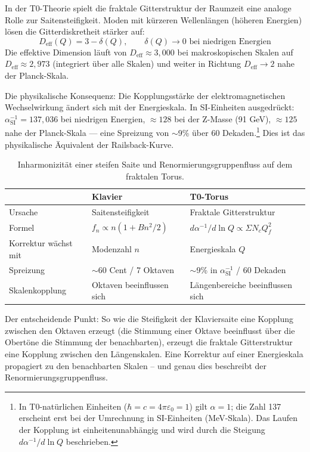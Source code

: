In der T0-Theorie spielt die fraktale Gitterstruktur der Raumzeit eine analoge Rolle zur Saitensteifigkeit. Moden mit kürzeren Wellenlängen (höheren Energien) lösen die Gitterdiskretheit stärker auf:
\begin{equation}
	D_\text{eff}(Q) = 3 - \delta(Q), \qquad \delta(Q) \to 0 \text{ bei niedrigen Energien}
\end{equation}
Die effektive Dimension läuft von $D_\text{eff} \approx 3{,}000$ bei makroskopischen Skalen auf $D_\text{eff} \approx 2{,}973$ (integriert über alle Skalen) und weiter in Richtung $D_\text{eff} \to 2$ nahe der Planck-Skala.

Die physikalische Konsequenz: Die Kopplungsstärke der elektromagnetischen Wechselwirkung ändert sich mit der Energieskala. In SI-Einheiten ausgedrückt: $\alpha_\text{SI}^{-1} = 137{,}036$ bei niedrigen Energien, $\approx 128$ bei der Z-Masse (91 GeV), $\approx 125$ nahe der Planck-Skala --- eine Spreizung von $\sim$9\% über 60 Dekaden.\footnote{In T0-natürlichen Einheiten ($\hbar = c = 4\pi\varepsilon_0 = 1$) gilt $\alpha = 1$; die Zahl 137 erscheint erst bei der Umrechnung in SI-Einheiten (MeV-Skala). Das Laufen der Kopplung ist einheitenunabhängig und wird durch die Steigung $d\alpha^{-1}/d\ln Q$ beschrieben.} Dies ist das physikalische Äquivalent der Railsback-Kurve.

\begin{table}[h]
\centering
\begin{tabular}{lll}
	\toprule
	& Klavier & T0-Torus\\
	\midrule
	Ursache & Saitensteifigkeit & Fraktale Gitterstruktur\\
	Formel & $f_n \propto n(1 + Bn^2/2)$ & $d\alpha^{-1}/d\ln Q \propto \Sigma N_c Q_f^2$\\
	Korrektur wächst mit & Modenzahl $n$ & Energieskala $Q$\\
	Spreizung & $\sim$60 Cent / 7 Oktaven & $\sim$9\% in $\alpha_\text{SI}^{-1}$ / 60 Dekaden\\
	Skalenkopplung & Oktaven beeinflussen sich & Längenbereiche beeinflussen sich\\
	\bottomrule
\end{tabular}
\caption{Inharmonizität einer steifen Saite und Renormierungsgruppenfluss auf dem fraktalen Torus.}
\label{tab:inharmonizitaet}
\end{table}

Der entscheidende Punkt: So wie die Steifigkeit der Klaviersaite eine Kopplung zwischen den Oktaven erzeugt (die Stimmung einer Oktave beeinflusst über die Obertöne die Stimmung der benachbarten), erzeugt die fraktale Gitterstruktur eine Kopplung zwischen den Längenskalen. Eine Korrektur auf einer Energieskala propagiert zu den benachbarten Skalen -- und genau dies beschreibt der Renormierungsgruppenfluss.


